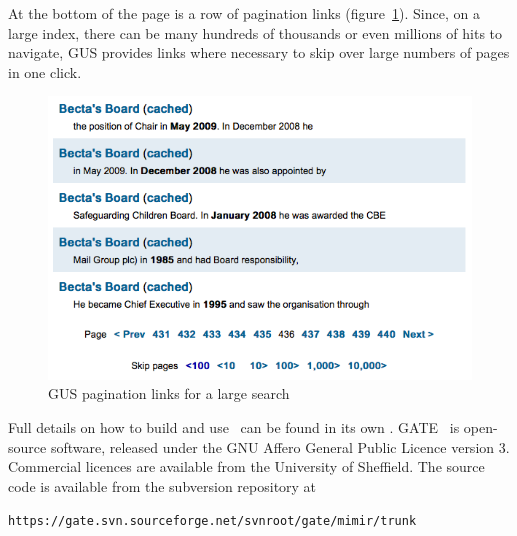 At the bottom of the page is a row of pagination links
(figure~\ref{fig:gus:pagination}).  Since, on a large index, there can be many
hundreds of thousands or even millions of hits to navigate, GUS provides links
where necessary to skip over large numbers of pages in one click.

\begin{figure}[tbp]
\begin{center}
\includegraphics[scale=0.5]{gus-pagination-links}
\caption{GUS pagination links for a large search}
\label{fig:gus:pagination}
\end{center}
\end{figure}

\else %

Full details on how to build and use \Mimir\ can be found in its own
.
GATE \Mimir\ is open-source software, released under the GNU Affero General
Public Licence version 3.  Commercial licences are available from the
University of Sheffield.  The source code is available from the subversion
repository at

{\tt https://gate.svn.sourceforge.net/svnroot/gate/mimir/trunk}

\fi %
